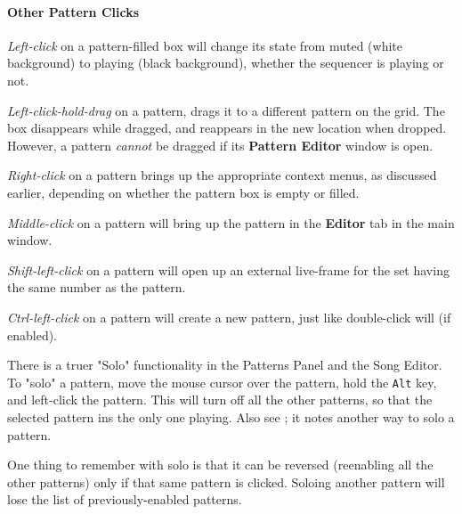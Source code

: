 \paragraph{Other Pattern Clicks}
\label{paragraph:patterns_pattern_clicks}

   \textsl{Left-click} on a pattern-filled box will change its state
   from muted (white background) to playing (black background), whether
   the sequencer is playing or not.

   \textsl{Left-click-hold-drag} on a pattern, drags it to a different
   pattern on the grid.
   The box disappears while dragged, and reappears in the new location when
   dropped.  However, a pattern \textsl{cannot} be dragged if its
   \textbf{Pattern Editor} window is open.

   \textsl{Right-click} on a pattern brings up the appropriate context menus, as
   discussed earlier, depending on whether the pattern box is empty or
   filled.

   \textsl{Middle-click} on a pattern will bring up the pattern
   in the \textbf{Editor}
   tab in the main window.

   \textsl{Shift-left-click} on a pattern will open up an external
   live-frame for the
   set having the same number as the pattern.

   \textsl{Ctrl-left-click} on a pattern will create a new pattern, just like
   double-click will (if enabled).

   There is a truer "Solo" functionality in the Patterns
   Panel and the Song Editor.  To "solo" a pattern, move the mouse cursor
   over the pattern, hold the \texttt{Alt} key, and left-click the pattern.
   This will turn off all the other patterns, so that the selected pattern ins
   the only one playing.
   Also see ; it notes another way to
   solo a pattern.

   One thing to remember with solo is that it can be reversed (reenabling all
   the other patterns) only if that same pattern is clicked. Soloing another
   pattern will lose the list of previously-enabled patterns.

